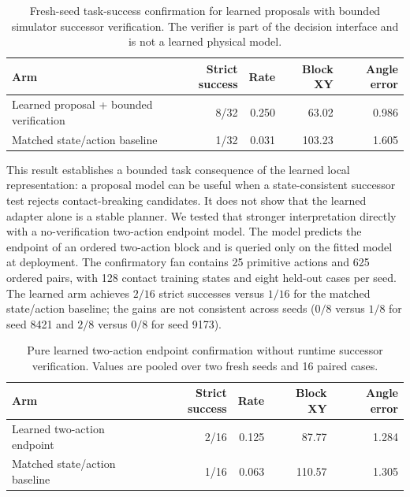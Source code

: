 \documentclass{article}
\begin{document}
\begin{table}[H]
\centering
\scriptsize
\setlength{\tabcolsep}{4pt}
\caption{Fresh-seed task-success confirmation for learned proposals with
bounded simulator successor verification. The verifier is part of the
decision interface and is not a learned physical model.}
\label{tab:supp-hybrid-confirmatory}
\begin{tabular}{lrrrr}
\toprule
Arm & Strict success & Rate & Block XY & Angle error \\
\midrule
Learned proposal + bounded verification & 8/32 & 0.250 & 63.02 & 0.986 \\
Matched state/action baseline & 1/32 & 0.031 & 103.23 & 1.605 \\
\bottomrule
\end{tabular}
\end{table}

This result establishes a bounded task consequence of the learned local
representation: a proposal model can be useful when a state-consistent
successor test rejects contact-breaking candidates.  It does not show that
the learned adapter alone is a stable planner.  We tested that stronger
interpretation directly with a no-verification two-action endpoint model.
The model predicts the endpoint of an ordered two-action block and is queried
only on the fitted model at deployment.  The confirmatory fan contains 25
primitive actions and 625 ordered pairs, with 128 contact training states and
eight held-out cases per seed.  The learned arm achieves $2/16$ strict
successes versus $1/16$ for the matched state/action baseline; the gains are
not consistent across seeds ($0/8$ versus $1/8$ for seed 8421 and $2/8$
versus $0/8$ for seed 9173).

\begin{table}[H]
\centering
\scriptsize
\setlength{\tabcolsep}{4pt}
\caption{Pure learned two-action endpoint confirmation without runtime
successor verification. Values are pooled over two fresh seeds and 16 paired
cases.}
\label{tab:supp-sequence-confirmatory}
\begin{tabular}{lrrrr}
\toprule
Arm & Strict success & Rate & Block XY & Angle error \\
\midrule
Learned two-action endpoint & 2/16 & 0.125 & 87.77 & 1.284 \\
Matched state/action baseline & 1/16 & 0.063 & 110.57 & 1.305 \\
\bottomrule
\end{tabular}
\end{table}
\end{document}
